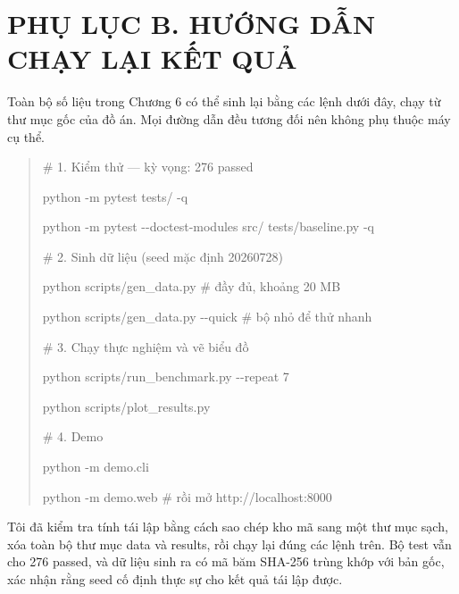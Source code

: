 \clearpage
{}
\chapter*{PHỤ LỤC B. HƯỚNG DẪN CHẠY LẠI KẾT QUẢ}

Toàn bộ số liệu trong Chương 6 có thể sinh lại bằng các lệnh dưới đây,
chạy từ thư mục gốc của đồ án. Mọi đường dẫn đều tương đối nên không phụ
thuộc máy cụ thể.

\begin{quote}
\# 1. Kiểm thử --- kỳ vọng: 276 passed

python -m pytest tests/ -q

python -m pytest -\/-doctest-modules src/ tests/baseline.py -q

\# 2. Sinh dữ liệu (seed mặc định 20260728)

python scripts/gen\_data.py \# đầy đủ, khoảng 20 MB

python scripts/gen\_data.py -\/-quick \# bộ nhỏ để thử nhanh

\# 3. Chạy thực nghiệm và vẽ biểu đồ

python scripts/run\_benchmark.py -\/-repeat 7

python scripts/plot\_results.py

\# 4. Demo

python -m demo.cli

python -m demo.web \# rồi mở http://localhost:8000
\end{quote}

Tôi đã kiểm tra tính tái lập bằng cách sao chép kho mã sang một thư mục
sạch, xóa toàn bộ thư mục data và results, rồi chạy lại đúng các lệnh
trên. Bộ test vẫn cho 276 passed, và dữ liệu sinh ra có mã băm SHA-256 trùng
khớp với bản gốc, xác nhận rằng seed cố định thực sự cho kết quả tái lập
được.
